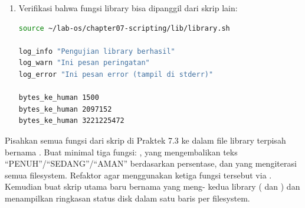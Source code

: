 \begin{enumerate}
    \textit{Amati:} skrip  tidak mendefinisikan
    sendiri fungsi seperti  atau .
    Semua diambil dari library menggunakan . Jika kamu perlu
    memperbaiki cara penulisan log, cukup ubah di  dan
    semua skrip yang menggunakannya ikut berubah.

    \item Verifikasi bahwa fungsi library bisa dipanggil dari skrip lain:
\begin{lstlisting}[language=bash, caption={Menguji fungsi library secara langsung}]
source ~/lab-os/chapter07-scripting/lib/library.sh

log_info "Pengujian library berhasil"
log_warn "Ini pesan peringatan"
log_error "Ini pesan error (tampil di stderr)"

bytes_ke_human 1500
bytes_ke_human 2097152
bytes_ke_human 3221225472
\end{lstlisting}
\end{enumerate}

\begin{challengebox}
Pisahkan semua fungsi dari skrip  di Praktek 7.3
ke dalam file library terpisah bernama . Buat
minimal tiga fungsi: , 
yang mengembalikan teks ``PENUH''/``SEDANG''/``AMAN'' berdasarkan
persentase, dan  yang mengiterasi semua
filesystem. Refaktor  agar menggunakan ketiga fungsi
tersebut via . Kemudian buat skrip utama baru bernama
 yang meng- kedua library
( dan ) dan menampilkan ringkasan
status disk dalam satu baris per filesystem.
\end{challengebox}

